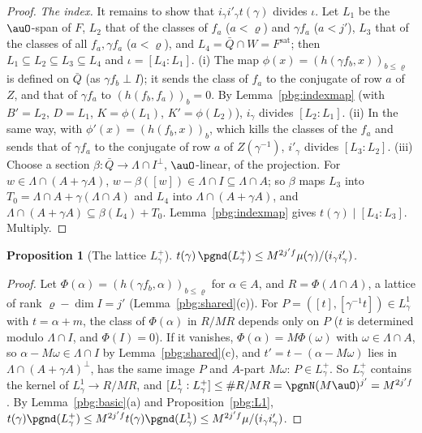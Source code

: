 \documentclass[10pt]{amsart}
\newtheorem{proposition}[theorem]{Proposition}
\theoremstyle{definition}
\theoremstyle{remark}
\begin{document}
\begin{proof}
\emph{The index.} It remains to show that $i_\gamma i'_\gamma t(\gamma)$ divides $\iota$. Let $L_1$ be
the $\auO$-span of $F$, $L_2$ that of the classes of $f_a$ ($a<\varrho$) and $\gamma f_a$ ($a<j'$), $L_3$
that of the classes of all $f_a,\gamma f_a$ ($a<\varrho$), and $L_4=\bar Q\cap W=F^{\mathrm{sat}}$; then
$L_1\subseteq L_2\subseteq L_3\subseteq L_4$ and $\iota=[L_4:L_1]$. (i) The map $\phi(x)=(h(\gamma f_b,
x))_{b\le\varrho}$ is defined on $\bar Q$ (as $\gamma f_b\perp I$); it sends the class of $f_a$ to the
conjugate of row $a$ of $Z$, and that of $\gamma f_a$ to $(h(f_b,f_a))_b=0$. By
Lemma~\ref{pbg:indexmap} (with $B'=L_2$, $D=L_1$, $K=\phi(L_1)$, $K'=\phi(L_2)$), $i_\gamma$ divides
$[L_2:L_1]$. (ii) In the same way, with $\phi'(x)=(h(f_b,x))_b$, which kills the classes of the
$f_a$ and sends that of $\gamma f_a$ to the conjugate of row $a$ of $Z(\gamma^{-1})$, $i'_\gamma$
divides $[L_3:L_2]$. (iii) Choose a section $\beta:\bar Q\to\Lambda\cap I^\perp$, $\auO$-linear, of the
projection. For $w\in\Lambda\cap(A+\gamma A)$, $w-\beta([w])\in\Lambda\cap I\subseteq\Lambda\cap A$; so
$\beta$ maps $L_3$ into $T_0=\Lambda\cap A+\gamma(\Lambda\cap A)$ and $L_4$ into $\Lambda\cap(A+\gamma A)$,
and $\Lambda\cap(A+\gamma A)\subseteq\beta(L_4)+T_0$. Lemma~\ref{pbg:indexmap} gives $t(\gamma)\mid[L_4:
L_3]$. Multiply.
\end{proof}

\begin{proposition}[The lattice $L^+_\gamma$]\label{pbg:Lplus}
$t(\gamma)\,\pgnd(L^+_\gamma)\le M^{2j'f}\mu(\gamma)/(i_\gamma i'_\gamma)$.
\end{proposition}
\begin{proof}
Let $\Phi(\alpha)=(h(\gamma f_b,\alpha))_{b\le\varrho}$ for $\alpha\in A$, and $R=\Phi(\Lambda\cap A)$, a
lattice of rank $\varrho-\dim I=j'$ (Lemma~\ref{pbg:shared}(c)). For $P=([t],[\gamma^{-1}t])\in
L^1_\gamma$ with $t=\alpha+m$, the class of $\Phi(\alpha)$ in $R/MR$ depends only on $P$ ($t$ is
determined modulo $\Lambda\cap I$, and $\Phi(I)=0$). If it vanishes, $\Phi(\alpha)=M\Phi(\omega)$ with
$\omega\in\Lambda\cap A$, so $\alpha-M\omega\in\Lambda\cap I$ by Lemma~\ref{pbg:shared}(c), and $t'=t-(
\alpha-M\omega)$ lies in $\Lambda\cap(A+\gamma A)^\perp$, has the same image $P$ and $A$-part $M\omega$:
$P\in L^+_\gamma$. So $L^+_\gamma$ contains the kernel of $L^1_\gamma\to R/MR$, and $[L^1_\gamma:
L^+_\gamma]\le\#R/MR=\pgnN(M\auO)^{j'}=M^{2j'f}$. By Lemma~\ref{pbg:basic}(a) and
Proposition~\ref{pbg:L1}, $t(\gamma)\pgnd(L^+_\gamma)\le M^{2j'f}t(\gamma)\pgnd(L^1_\gamma)\le M^{2j'f}
\mu/(i_\gamma i'_\gamma)$.
\end{proof}
\end{document}

